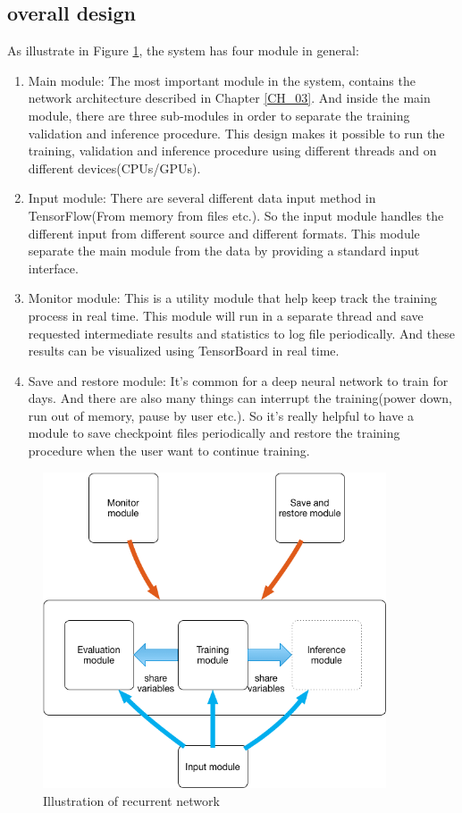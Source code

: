 \subsection{overall design}
As illustrate in Figure \ref{fig:system}, the system has four module in general:
\begin{enumerate}
   \item Main module: The most important module in the system, contains the network architecture described in Chapter \ref{CH_03}. And inside the main module, there are three sub-modules in order to separate the training validation and inference procedure. This design makes it possible to run the training, validation and inference procedure using different threads and on different devices(CPUs/GPUs). 
   \item Input module: There are several different data input method in TensorFlow(From memory from files etc.). So the input module handles the different input from different source and different formats. This module separate the main module from the data by providing a standard input interface.
   \item Monitor module: This is a utility module that help keep track the training process in real time. This module will run in a separate thread and save requested intermediate results and statistics to log file periodically. And these results can be visualized using TensorBoard in real time.
   \item Save and restore module: It's common for a deep neural network to train for days. And there are also many things can interrupt the training(power down, run out of memory, pause by user etc.). So it's really helpful to have a module to save checkpoint files periodically and  
   restore the training procedure when the user want to continue training.
\end{enumerate}

\begin{figure}[H] 
	\centering
	\includegraphics[width=4in]{Figures/system}
	\caption[Detail inside recurrent unit]{Illustration of recurrent network}
	\label{fig:system}
\end{figure}


